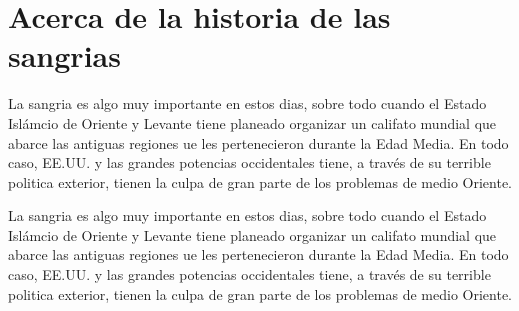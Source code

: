 \documentclass[11pt]{article}
\begin{document}
\section{Acerca de la historia de las sangrias}
\setlength{\parindent}{0cm}
\par
La sangria es algo muy importante en estos dias, sobre todo cuando el Estado Islámcio de Oriente y Levante tiene planeado organizar un califato mundial que abarce las antiguas regiones ue les pertenecieron durante la Edad Media. En todo caso, EE.UU. y las grandes potencias occidentales tiene, a través de su terrible politica exterior, tienen la culpa de gran parte de los problemas de medio Oriente.
\setlength{\parindent}{1cm}
\par
La sangria es algo muy importante en estos dias, sobre todo cuando el Estado Islámcio de Oriente y Levante tiene planeado organizar un califato mundial que abarce las antiguas regiones ue les pertenecieron durante la Edad Media. En todo caso, EE.UU. y las grandes potencias occidentales tiene, a través de su terrible politica exterior, tienen la culpa de gran parte de los problemas de medio Oriente.
\par 
{}
\end{document}
